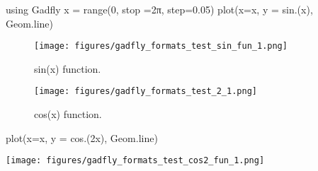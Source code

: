 
\begin{juliacode}
using Gadfly
x = range(0, stop =2π, step=0.05)
plot(x=x, y = sin.(x), Geom.line)
\end{juliacode}
\begin{figure}[ht]
\center
\texttt{[image: figures/gadfly\_formats\_test\_sin\_fun\_1.png]}
\caption{sin(x) function.}
\label{fig:sin_fun}
\end{figure}

\begin{figure}[htpb]
\center
\texttt{[image: figures/gadfly\_formats\_test\_2\_1.png]}
\caption{cos(x) function.}
\end{figure}

\begin{juliacode}
plot(x=x, y = cos.(2x), Geom.line)
\end{juliacode}
\texttt{[image: figures/gadfly\_formats\_test\_cos2\_fun\_1.png]}
